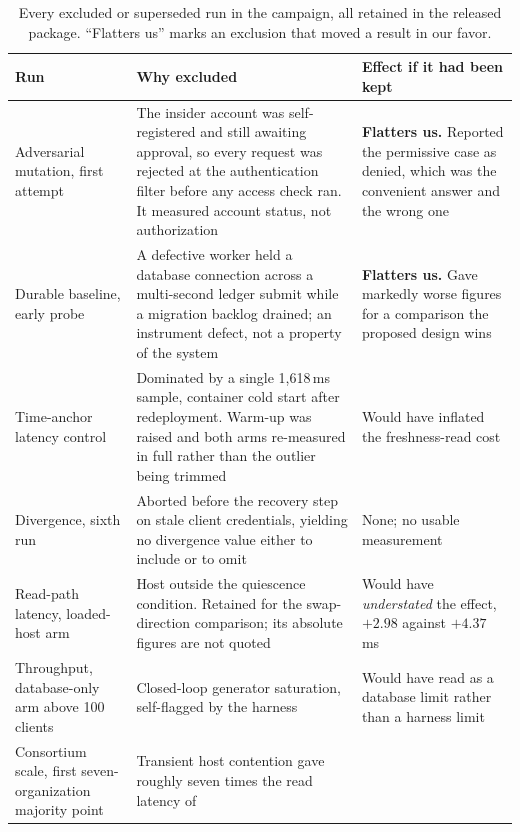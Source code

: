 \documentclass[preprint,12pt]{elsarticle}
\begin{document}
\begin{table}[!t]
\centering
\caption{Every excluded or superseded run in the campaign, all retained in
the released package. ``Flatters us'' marks an exclusion that moved a result
in our favor.}
\label{tab:excluded}
\scriptsize
\setlength{\tabcolsep}{4pt}
\begin{tabular}{@{}>{\raggedright\arraybackslash}p{}%
                 >{\raggedright\arraybackslash}p{}%
                 >{\raggedright\arraybackslash}p{}@{}}
\toprule
Run & Why excluded & Effect if it had been kept \\
\midrule
Adversarial mutation, first attempt &
The insider account was self-registered and still awaiting approval, so every
request was rejected at the authentication filter before any access check ran.
It measured account status, not authorization &
\textbf{Flatters us.} Reported the permissive case as denied, which was the
convenient answer and the wrong one \\
\addlinespace
Durable baseline, early probe &
A defective worker held a database connection across a multi-second ledger
submit while a migration backlog drained; an instrument defect, not a property
of the system &
\textbf{Flatters us.} Gave markedly worse figures for a comparison the
proposed design wins \\
\addlinespace
Time-anchor latency control &
Dominated by a single 1{,}618\,ms sample, container cold start after
redeployment. Warm-up was raised and both arms re-measured in full rather than
the outlier being trimmed &
Would have inflated the freshness-read cost \\
\addlinespace
Divergence, sixth run &
Aborted before the recovery step on stale client credentials, yielding no
divergence value either to include or to omit &
None; no usable measurement \\
\addlinespace
Read-path latency, loaded-host arm &
Host outside the quiescence condition. Retained for the swap-direction
comparison; its absolute figures are not quoted &
Would have \emph{understated} the effect, $+2.98$ against $+4.37$\,ms \\
\addlinespace
Throughput, database-only arm above 100 clients &
Closed-loop generator saturation, self-flagged by the harness &
Would have read as a database limit rather than a harness limit \\
\addlinespace
Consortium scale, first seven-organization majority point &
Transient host contention gave roughly seven times the read latency of

\end{tabular}
\end{table}
\end{document}

